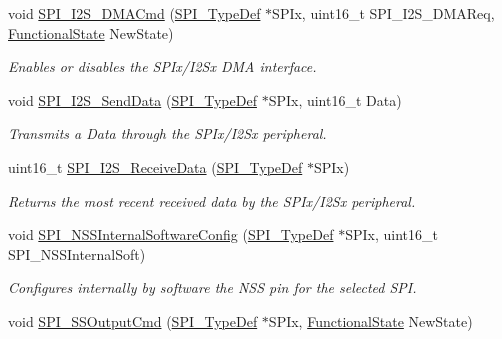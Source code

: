 \begin{DoxyCompactItemize}
void \mbox{\hyperlink{group___s_p_i___private___functions_gabed5b91a8576e6d578f364cc0e807e4a}{S\+P\+I\+\_\+\+I2\+S\+\_\+\+D\+M\+A\+Cmd}} (\mbox{\hyperlink{struct_s_p_i___type_def}{S\+P\+I\+\_\+\+Type\+Def}} $\ast$S\+P\+Ix, uint16\+\_\+t S\+P\+I\+\_\+\+I2\+S\+\_\+\+D\+M\+A\+Req, \mbox{\hyperlink{group___exported__types_gac9a7e9a35d2513ec15c3b537aaa4fba1}{Functional\+State}} New\+State)
\begin{DoxyCompactList}\small\item\em Enables or disables the S\+P\+Ix/\+I2\+Sx D\+MA interface. \end{DoxyCompactList}\item 
void \mbox{\hyperlink{group___s_p_i___private___functions_gad5af40bebe8dbe3fa8bd476489d7e3da}{S\+P\+I\+\_\+\+I2\+S\+\_\+\+Send\+Data}} (\mbox{\hyperlink{struct_s_p_i___type_def}{S\+P\+I\+\_\+\+Type\+Def}} $\ast$S\+P\+Ix, uint16\+\_\+t Data)
\begin{DoxyCompactList}\small\item\em Transmits a Data through the S\+P\+Ix/\+I2\+Sx peripheral. \end{DoxyCompactList}\item 
uint16\+\_\+t \mbox{\hyperlink{group___s_p_i___private___functions_gab77de76547f3bff403236b263b070a30}{S\+P\+I\+\_\+\+I2\+S\+\_\+\+Receive\+Data}} (\mbox{\hyperlink{struct_s_p_i___type_def}{S\+P\+I\+\_\+\+Type\+Def}} $\ast$S\+P\+Ix)
\begin{DoxyCompactList}\small\item\em Returns the most recent received data by the S\+P\+Ix/\+I2\+Sx peripheral. \end{DoxyCompactList}\item 
void \mbox{\hyperlink{group___s_p_i___private___functions_ga56fc508a482f032f9eb80e4c63184126}{S\+P\+I\+\_\+\+N\+S\+S\+Internal\+Software\+Config}} (\mbox{\hyperlink{struct_s_p_i___type_def}{S\+P\+I\+\_\+\+Type\+Def}} $\ast$S\+P\+Ix, uint16\+\_\+t S\+P\+I\+\_\+\+N\+S\+S\+Internal\+Soft)
\begin{DoxyCompactList}\small\item\em Configures internally by software the N\+SS pin for the selected S\+PI. \end{DoxyCompactList}\item 
void \mbox{\hyperlink{group___s_p_i___private___functions_ga4ec54abdedf6cd17403d853a926d91c1}{S\+P\+I\+\_\+\+S\+S\+Output\+Cmd}} (\mbox{\hyperlink{struct_s_p_i___type_def}{S\+P\+I\+\_\+\+Type\+Def}} $\ast$S\+P\+Ix, \mbox{\hyperlink{group___exported__types_gac9a7e9a35d2513ec15c3b537aaa4fba1}{Functional\+State}} New\+State)

\end{DoxyCompactItemize}
